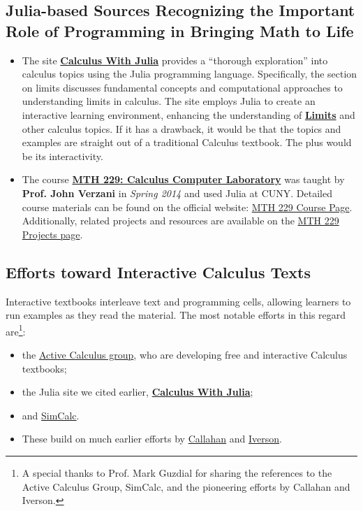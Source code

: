 \subsection{Julia-based Sources Recognizing the Important Role of Programming in Bringing Math to Life}



\begin{itemize}
    \item The site \href{https://jverzani.github.io/CalculusWithJuliaNotes.jl/limits/limits.html}{\bf Calculus With Julia} provides a ``thorough exploration'' into calculus topics using the Julia programming language. Specifically, the section on limits discusses fundamental concepts and computational approaches to understanding limits in calculus. The site employs Julia to create an interactive learning environment, enhancing the understanding of \href{https://jverzani.github.io/CalculusWithJuliaNotes.jl/limits/limits.html}{\textbf{Limits}} and other calculus topics. If it has a drawback, it would be that the topics and examples are straight out of a traditional Calculus textbook. The plus would be its interactivity. 

\item The course \href{https://www.math.csi.cuny.edu/abhijit/229/}{\textbf{MTH 229: Calculus Computer Laboratory}} was taught by \textbf{Prof. John Verzani} in \textit{Spring 2014} and used Julia at CUNY. Detailed course materials can be found on the official website: \href{https://www.math.csi.cuny.edu/abhijit/229/}{MTH 229 Course Page}. Additionally, related projects and resources are available on the \href{https://mth229.github.io/}{MTH 229 Projects page}.
\end{itemize}

\subsection{Efforts toward Interactive Calculus Texts}

Interactive textbooks interleave text and programming cells, allowing learners to run examples as they read the material. The most notable efforts in this regard are\footnote{A special thanks to Prof. Mark Guzdial for sharing the references to the Active Calculus Group, SimCalc, and the pioneering efforts by Callahan and Iverson.}:
\begin{itemize}
    \item the \href{https://activecalculus.org/}{Active Calculus group}, who are developing free and interactive Calculus textbooks; 
    \item the Julia site we cited earlier, \href{https://jverzani.github.io/CalculusWithJuliaNotes.jl/limits/limits.html}{\bf Calculus With Julia};
    \item and \href{https://www.amazon.com/SimCalc-Vision-Contributions-Democratizing-Mathematics-ebook/dp/B00BLSOU10/}{SimCalc}.
    \item These build on much earlier efforts by \href{https://www.science.smith.edu/~callahan/intromine.html}{Callahan} and \href{https://www.jsoftware.com/books/pdf/calculus.pdf}{Iverson}.
\end{itemize}

